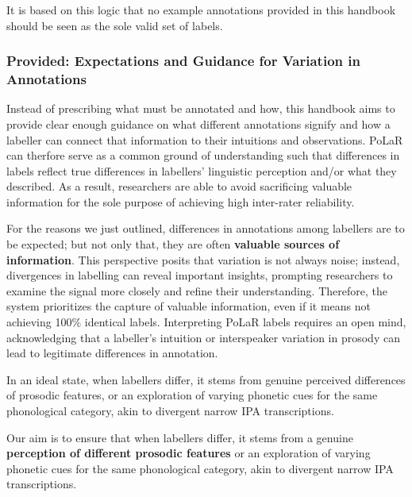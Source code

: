 \documentclass[11pt, twoside]{memoir}
\begin{document}
It is based on this logic that no example annotations provided in this handbook should be seen as the sole valid set of labels.

\subsubsection{Provided: Expectations and Guidance for Variation in Annotations}\label{sec:Expectations and Guidance for Variation in Annotations}

Instead of prescribing what must be annotated and how, this handbook aims to provide clear enough guidance on what different annotations signify and how a labeller can connect that information to their intuitions and observations. PoLaR can therfore serve as a common ground of understanding such that differences in labels reflect true differences in labellers' linguistic perception and/or what they described. As a result, researchers are able to avoid sacrificing valuable information for the sole purpose of achieving high inter-rater reliability.


For the reasons we just outlined, differences in annotations among labellers are to be expected; but not only that, they are often \textbf{valuable sources of information}. This perspective posits that variation is not always noise; instead, divergences in labelling can reveal important insights, prompting researchers to examine the signal more closely and refine their understanding. Therefore, the system prioritizes the capture of valuable information, even if it means not achieving 100\% identical labels. Interpreting PoLaR labels requires an open mind, acknowledging that a labeller's intuition or interspeaker variation in prosody can lead to legitimate differences in annotation.

In an ideal state, when labellers differ, it stems from genuine perceived differences of prosodic features, or an exploration of varying phonetic cues for the same phonological category, akin to divergent narrow IPA transcriptions. 

Our aim is to ensure that when labellers differ, it stems from a genuine \textbf{perception of different prosodic features} or an exploration of varying phonetic cues for the same phonological category, akin to divergent narrow IPA transcriptions. 


\end{document}

